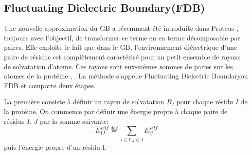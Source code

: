 \subsection{\og Fluctuating Dielectric Boundary\fg (FDB)}
\label{sec:FDB}
Une nouvelle approximation du GB a récemment été introduite dans Proteus \cite{Villa17}, toujours avec l'objectif, de transformer ce terme en en terme décomposable par paires. Elle exploite le fait que dans le GB, l'environnement diélectrique d'une paire de résidus est complètement caractérisé pour un petit ensemble de rayons de solvatation d'atome. Ces rayons sont eux-mêmes sommes de paires sur les atomes de la protéine \cite{Hawkins95}, \cite{Schaefer96}. La méthode s'appelle Fluctuating Dielectric Boundary\fg ou FDB et comporte deux étapes.

La première consiste à définir un rayon de solvatation $B_I$ pour chaque résidu $I$ de la protéine. On commence par définir une énergie propre à chaque paire de résidus $I$, $J$ par la somme suivante:
\begin{equation}
  E_{IJ}^{self} \stackrel{def}{=} \sum_{i\in I,j\in J} E_{ij}^{self}
\end{equation}
puis l'énergie propre d'un résidu I:

